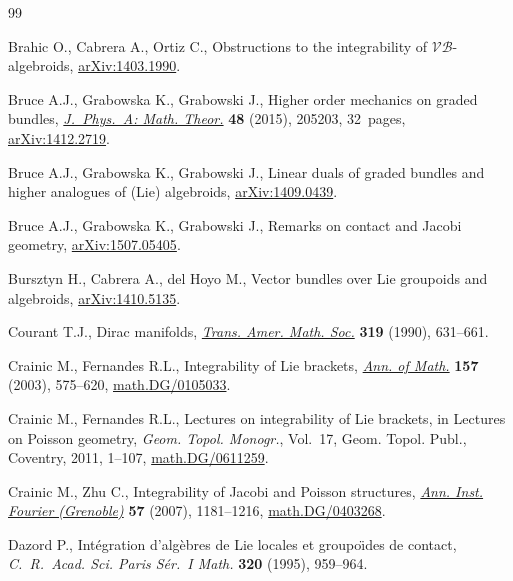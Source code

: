\documentclass[pdftex]{sigma}
\numberwithin{equation}{section}
\begin{document}
\begin{thebibliography}{99}
\footnotesize\itemsep=0pt

Brahic O., Cabrera A., Ortiz C., Obstructions to the integrability of
  $\mathcal{VB}$-algebroids, \href{http://arxiv.org/abs/1403.1990}{arXiv:1403.1990}.


Bruce A.J., Grabowska K., Grabowski J., Higher order mechanics on graded
  bundles, \href{http://dx.doi.org/10.1088/1751-8113/48/20/205203}{\textit{J.~Phys.~A: Math. Theor.}} \textbf{48} (2015), 205203,
  32~pages, \href{http://arxiv.org/abs/1412.2719}{arXiv:1412.2719}.


Bruce A.J., Grabowska K., Grabowski J., Linear duals of graded bundles and
  higher analogues of (Lie) algebroids, \href{http://arxiv.org/abs/1409.0439}{arXiv:1409.0439}.

Bruce A.J., Grabowska K., Grabowski J., Remarks on contact and Jacobi geometry,
  \href{http://arxiv.org/abs/1507.05405}{arXiv:1507.05405}.

Bursztyn H., Cabrera A., del Hoyo M., Vector bundles over Lie groupoids and
  algebroids, \href{http://arxiv.org/abs/1410.5135}{arXiv:1410.5135}.

Courant T.J., Dirac manifolds, \href{http://dx.doi.org/10.2307/2001258}{\textit{Trans. Amer. Math. Soc.}} \textbf{319}
  (1990), 631--661.

Crainic M., Fernandes R.L., Integrability of {L}ie brackets, \href{http://dx.doi.org/10.4007/annals.2003.157.575}{\textit{Ann. of
  Math.}} \textbf{157} (2003), 575--620, \href{http://arxiv.org/abs/math.DG/0105033}{math.DG/0105033}.

Crainic M., Fernandes R.L., Lectures on integrability of {L}ie brackets, in
  Lectures on {P}oisson geometry, \textit{Geom. Topol. Monogr.}, Vol.~17, Geom.
  Topol. Publ., Coventry, 2011, 1--107, \href{http://arxiv.org/abs/math.DG/0611259}{math.DG/0611259}.

Crainic M., Zhu C., Integrability of {J}acobi and {P}oisson structures,
  \href{http://dx.doi.org/10.5802/aif.2291}{\textit{Ann. Inst. Fourier (Grenoble)}} \textbf{57} (2007), 1181--1216,
  \href{http://arxiv.org/abs/math.DG/0403268}{math.DG/0403268}.

Dazord P., Int\'egration d'alg\`ebres de {L}ie locales et groupo\"\i des de
  contact, \textit{C.~R.~Acad. Sci. Paris S\'er.~I Math.} \textbf{320} (1995),
  959--964.


\end{thebibliography}
\end{document}
